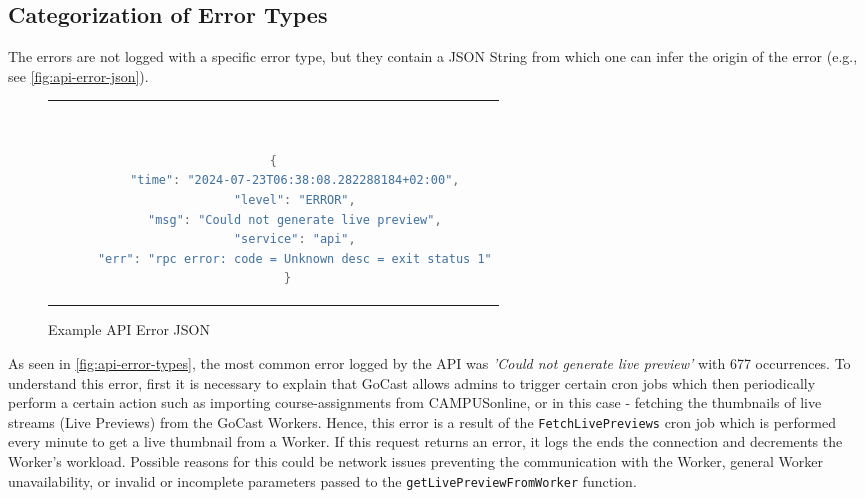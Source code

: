 
\subsection{Categorization of Error Types}

The errors are not logged with a specific error type, but they contain a JSON String from which one can infer the origin of the error (e.g., see \autoref{fig:api-error-json}).

\begin{figure}[htpb]
  \begin{tabular}{c}
  \ \small \begin{lstlisting}[language=Java]
    {
      "time": "2024-07-23T06:38:08.282288184+02:00",
      "level": "ERROR",
      "msg": "Could not generate live preview",
      "service": "api",
      "err": "rpc error: code = Unknown desc = exit status 1"
    }
    \end{lstlisting}
  \end{tabular}
  \caption[Example \ac{API} Error JSON]{Example \ac{API} Error JSON}\label{fig:api-error-json}
\end{figure}

\noindent As seen in \autoref{fig:api-error-types}, the most common error logged by the \ac{API} was \textit{'Could not generate live preview'} with 677 occurrences. To understand this error, first it is necessary to explain that GoCast allows admins to trigger certain cron jobs which then periodically perform a certain action such as importing course-assignments from CAMPUSonline, or in this case - fetching the thumbnails of live streams (Live Previews) from the GoCast Workers. Hence, this error is a result of the \texttt{FetchLivePreviews} cron job which is performed every minute to get a live thumbnail from a Worker. If this request returns an error, it logs the  ends the connection and decrements the Worker's workload. Possible reasons for this could be network issues preventing the communication with the Worker, general Worker unavailability, or invalid or incomplete parameters passed to the \texttt{getLivePreviewFromWorker} function.

